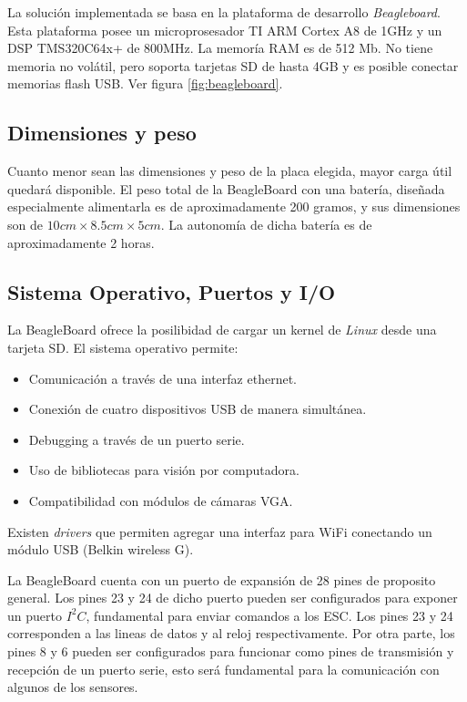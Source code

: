 \documentclass[main]{subfiles}
\begin{document}
La soluci\'on implementada se basa en la plataforma de desarrollo \emph{Beagleboard}. Esta plataforma posee un microprosesador TI ARM Cortex A8 de 1GHz y un DSP TMS320C64x+ de 800MHz. La memor\'ia RAM es de 512 Mb. No tiene memoria no vol\'atil, pero soporta tarjetas SD de hasta 4GB y es posible conectar memorias flash USB. Ver figura \ref{fig:beagleboard}.

\subsection*{Dimensiones y peso}

Cuanto menor sean las dimensiones y peso de la placa elegida, mayor carga \'util quedar\'a disponible. El peso total de la BeagleBoard con una bater\'ia, diseñada especialmente alimentarla es de aproximadamente 200 gramos, y sus dimensiones son de $10cm\times8.5cm\times5cm$. La autonom\'ia de dicha bater\'ia es de aproximadamente 2 horas.

\subsection*{Sistema Operativo, Puertos y I/O}

La BeagleBoard ofrece la posilibidad de cargar un kernel de \emph{Linux} desde una tarjeta SD. El sistema operativo permite:
\begin{itemize}
\item Comunicaci\'on a trav\'es de una interfaz ethernet.
\item Conexi\'on de cuatro dispositivos USB de manera simult\'anea.
\item Debugging a trav\'es de un puerto serie.
\item Uso de bibliotecas para visi\'on por computadora. 
\item Compatibilidad con m\'odulos de c\'amaras VGA.
\end{itemize}

Existen \textit{drivers} que permiten agregar una interfaz para WiFi conectando un m\'odulo USB (Belkin wireless G).

La BeagleBoard cuenta con un puerto de expansi\'on de 28 pines de proposito general. Los pines 23 y 24 de dicho puerto pueden ser configurados para exponer un puerto $I^2C$, fundamental para enviar comandos a los ESC. Los pines 23 y 24 corresponden a las lineas de datos y al reloj respectivamente. Por otra parte, los pines 8 y 6 pueden ser configurados para funcionar como pines de transmisi\'on y recepci\'on de un puerto serie, esto ser\'a fundamental para la comunicaci\'on con algunos de los sensores.
\end{document}
